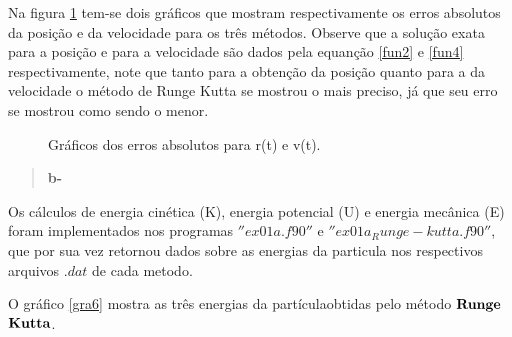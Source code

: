 \documentclass[a4wide]{report}
\begin{document}

Na figura \ref{gra5} tem-se dois gráficos que mostram respectivamente os erros absolutos da posição e da velocidade para os três métodos.
Observe que a solução exata para a posição e para a velocidade são dados pela equanção \ref{fun2} e \ref{fun4} respectivamente, note que
tanto para a obtenção da posição quanto para a da velocidade o método de Runge Kutta se mostrou o mais preciso, já que seu erro se mostrou 
como sendo o menor. 
\\
\begin{figure}[!ht]
\centering
{}\qquad 
{}\qquad 
\caption{Gráficos dos erros absolutos para r(t) e v(t).}
\label{gra5}
\end{figure}

\newpage

\begin{quote}

\bf b- 

\end{quote}

Os cálculos de energia cinética (K), energia potencial (U) e energia mecânica (E) foram implementados nos programas $''ex01a.f90''$ e $''ex01a_Runge-kutta.f90''$, 
que por sua vez retornou dados sobre as energias da particula nos respectivos arquivos $.dat$ de cada metodo. 

O gráfico \ref{gra6} mostra as três energias da partículaobtidas pelo método $\bf Runge$ $\bf Kutta$.
\end{document}
